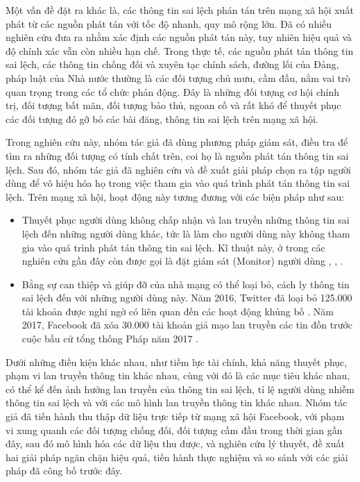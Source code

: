 Một vấn đề đặt ra khác là, các thông tin sai lệch phán tán trên mạng xã hội xuất phát từ các nguồn phát tán với tốc độ nhanh, quy mô rộng lớn. Đã có nhiều nghiên cứu đưa ra nhằm xác định các nguồn phát tán này, tuy nhiên hiệu quả và độ chính xác vẫn còn nhiều hạn chế. Trong thực tế, các nguồn phát tán thông tin sai lệch, các thông tin chống đối và xuyên tạc chính sách, đường lối của Đảng, pháp luật của Nhà nước thường là các đối tượng chủ mưu, cầm đầu, nắm vai trò quan trọng trong các tổ chức phản động. Đây là những đối tượng cơ hội chính trị, đối tượng bất mãn, đối tượng bảo thủ, ngoan cố và rất khó để thuyết phục các đối tượng đó gỡ bỏ các bài đăng, thông tin sai lệch trên mạng xã hội.

Trong nghiên cứu này, nhóm tác giả đã dùng phương pháp giám sát, điều tra để tìm ra những đối tượng có tính chất trên, coi họ là nguồn phát tán thông tin sai lệch. Sau đó, nhóm tác giả đã nghiên cứu và đề xuất giải pháp chọn ra tập người dùng để vô hiệu hóa họ trong việc tham gia vào quá trình phát tán thông tin sai lệch. Trên mạng xã hội, hoạt động này tương đương với các biện pháp như sau:
\begin {itemize}
	\item Thuyết phục người dùng không chấp nhận và lan truyền những thông tin sai lệch đến những người dùng khác, tức là làm cho người dùng này không tham gia vào quá trình phát tán thông tin sai lệch. Kĩ thuật này, ở trong các nghiên cứu gần đây còn được gọi là đặt giám sát (Monitor) người dùng \cite{zhang32}, \cite{zhang33}, \cite{zhang34}.

	\item Bằng sự can thiệp và giúp đỡ của nhà mạng có thể loại bỏ, cách ly thông tin sai lệch đến với những người dùng này. Năm 2016, Twitter đã loại bỏ 125.000 tài khoản được nghi ngờ có liên quan đến các hoạt động khủng bố \cite{twitter}. Năm 2017, Facebook đã xóa 30.000 tài khoản giả mạo lan truyền các tin đồn trước cuộc bầu cử tổng thống Pháp năm 2017 \cite{french}.
\end {itemize}

Dưới những điều kiện khác nhau, như tiềm lực tài chính, khả năng thuyết phục, phạm vi lan truyền thông tin khác nhau, cùng với đó là các mục tiêu khác nhau, có thể kể đến ảnh hưởng lan truyền của thông tin sai lệch, tỉ lệ người dùng nhiễm thông tin sai lệch và với các mô hình lan truyền thông tin khác nhau. Nhóm tác giả đã tiến hành thu thập dữ liệu trực tiếp từ mạng xã hội Facebook, với phạm vi xung quanh các đối tượng chống đối, đối tượng cầm đầu trong thời gian gần đây, sau đó mô hình hóa các dữ liệu thu được, và nghiên cứu lý thuyết, đề xuất hai giải pháp ngăn chặn hiệu quả, tiến hành thực nghiệm và so sánh với các giải pháp đã công bố trước đây. 

